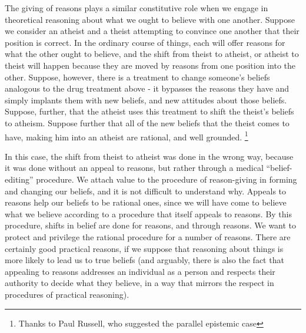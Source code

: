 \documentclass[phd,12pt,oneside,paper=letterpaper]{ubcthesis}
\begin{document}
The giving of reasons plays a similar constitutive role when we engage in theoretical reasoning about what we ought to believe with one another. Suppose we consider an atheist and a theist attempting to convince one another that their position is correct. In the ordinary course of things, each will offer reasons for what the other ought to believe, and the shift from theist to atheist, or atheist to theist will happen because they are moved by reasons from one position into the other. Suppose, however, there is a treatment to change someone's beliefs analogous to the drug treatment above - it bypasses the reasons they have and simply implants them with new beliefs, and new attitudes about those beliefs. Suppose, further, that the atheist uses this treatment to shift the theist's beliefs to atheism. Suppose further that all of the new beliefs that the theist comes to have, making him into an atheist are rational, and well grounded. \footnote{Thanks to Paul Russell, who suggested the parallel epistemic case}

In this case, the shift from theist to atheist was done in the wrong way, because it was done without an appeal to reasons, but rather through a medical ``belief-editing'' procedure. We attach value to the procedure of reason-giving in forming and changing our beliefs, and it is not difficult to understand why. Appeals to reasons help our beliefs to be rational ones, since we will have come to believe what we believe according to a procedure that itself appeals to reasons. By this procedure, shifts in belief are done for reasons, and through reasons. We want to protect and privilege the rational procedure for a number of reasons. There are certainly good practical reasons, if we suppose that reasoning about things is more likely to lead us to true beliefs (and arguably, there is also the fact that appealing to reasons addresses an individual as a person and respects their authority to decide what they believe, in a way that mirrors the respect in procedures of practical reasoning). 
\end{document}
